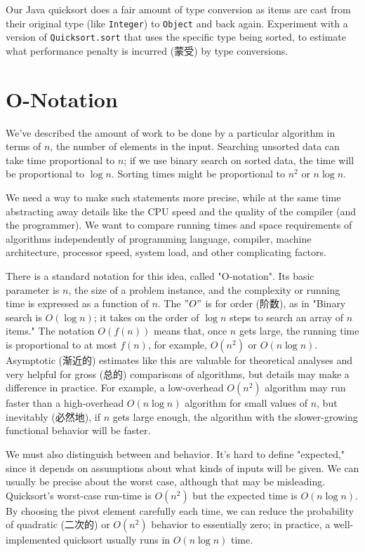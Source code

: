 \begin{exercise}
Our Java quicksort does a fair amount of type conversion as items are cast
from their original type (like \verb'Integer') to \verb'Object' and back
again.  Experiment with a version of \verb'Quicksort.sort' that uses the
specific type being sorted, to estimate what performance penalty is
incurred (蒙受) by type conversions.
\end{exercise}

\section{O-Notation}
\label{sec:o_notation}

We've described the amount of work to be done by a particular algorithm in
terms of $n$, the number of elements in the input. Searching unsorted data
can take time proportional to $n$; if we use binary search on sorted data,
the time will be proportional to $\log n$. Sorting times might be
proportional to $n^2$ or $n\log n$.

We need a way to make such statements more precise, while at the same time
abstracting away details like the CPU speed and the quality of the compiler
(and the programmer). We want to compare running times and space
requirements of algorithms independently of programming language, compiler,
machine architecture, processor speed, system load, and other complicating
factors.

There is a standard notation for this idea, called "O-notation". Its basic
parameter is $n$, the size of a problem instance, and the complexity or
running time is expressed as a function of $n$. The $"O"$ is for order
(阶数), as in "Binary search is $O(\log n)$; it takes on the order of $\log
n$ steps to search an array of $n$ items." The notation $O(f(n))$ means
that, once $n$ gets large, the running time is proportional to at most
$f(n)$, for example, $O(n^2)$ or $O(n\log n)$. Asymptotic (渐近的)
estimates like this are valuable for theoretical analyses and very helpful
for gross (总的) comparisons of algorithms, but details may make a
difference in practice. For example, a low-overhead $O(n^2)$ algorithm may
run faster than a high-overhead $O(n\log n)$ algorithm for small values of
$n$, but inevitably (必然地), if $n$ gets large enough, the algorithm with
the slower-growing functional behavior will be faster.

We must also distinguish between  and 
behavior. It's hard to define "expected," since it depends on assumptions
about what kinds of inputs will be given. We can usually be precise about
the worst case, although that may be misleading.  Quicksort's worst-case
run-time is $O(n^2)$ but the expected time is $O(n\log n)$. By choosing the
pivot element carefully each time, we can reduce the probability of
quadratic (二次的) or $O(n^2)$ behavior to essentially zero; in practice, a
well-implemented quicksort usually runs in $O(n\log n)$ time.

